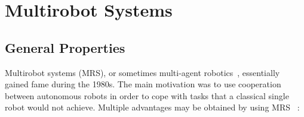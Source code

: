 \section{Multirobot Systems}
\label{sec:MRS}

  






  \subsection{General Properties} 

    Multirobot systems (MRS), or sometimes multi-agent robotics~\parencite{Dudek1996}, essentially gained fame during the 1980s. The main motivation was to use cooperation between autonomous robots in order to cope with tasks that a classical single robot would not achieve. Multiple advantages may be obtained by using MRS~\parencite{Cao1997, Arkin1998a} :

